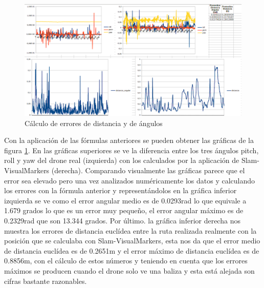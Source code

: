 \begin{figure}[H]
	\begin{center}
		\includegraphics[width=1\textwidth]{imag/IMG36.png}
				\caption{Cálculo de errores de distancia y de ángulos}
		\label{fig:Error de distancia y de giro.}	
	\end{center}
\end{figure}

\hspace{1cm} Con la aplicación de las fórmulas anteriores se pueden obtener las gráficas de la figura \ref{fig:Error de distancia y de giro.}. En las gráficas superiores se ve la diferencia entre los tres ángulos pitch, roll y yaw del drone real (izquierda) con los calculados por la aplicación de Slam-VisualMarkers (derecha). Comparando visualmente las gráficas parece que el error sea elevado pero una vez analizados numéricamente los datos y calculando los errores con la fórmula anterior y representándolos en la gráfica inferior izquierda se ve como el error angular medio es de 0.0293rad lo que equivale a 1.679 grados lo que es un error muy pequeño, el error angular máximo es de 0.2329rad que son 13.344 grados. Por último. la gráfica inferior derecha nos muestra los errores de distancia euclídea entre la ruta realizada realmente con la posición que se calculaba con Slam-VisualMarkers, esta nos da que el error medio de distancia euclídea es de 0.2651m y el error máximo de distancia euclídea es de 0.8856m, con el cálculo de estos números y teniendo en cuenta que los errores máximos se producen cuando el drone solo ve una baliza y esta está alejada son cifras bastante razonables.

